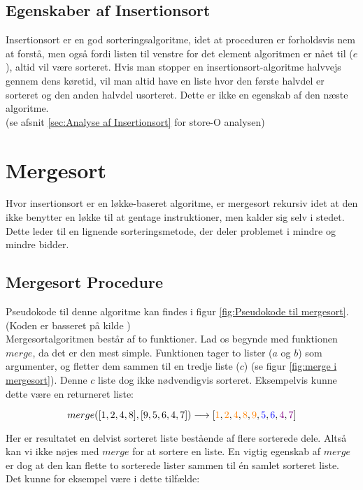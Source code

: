 \subsection{Egenskaber af Insertionsort}%
\label{sub:Egenskaber af Insertionsort}
Insertionsort er en god sorteringsalgoritme, idet at proceduren er forholdsvis nem at forstå, men også fordi listen til venstre for det element algoritmen er nået til ($e$), altid vil være sorteret. Hvis man stopper en insertionsort-algoritme halvvejs gennem dens køretid, vil man altid have en liste hvor den første halvdel er sorteret og den anden halvdel usorteret. Dette er ikke en egenskab af den næste algoritme.\\

(se afsnit \ref{sec:Analyse af Insertionsort} for store-O analysen)



\section{Mergesort}
\label{sec:Mergesort}

Hvor insertionsort er en løkke-baseret algoritme, er mergesort rekursiv idet at den ikke benytter en løkke til at gentage instruktioner, men kalder sig selv i stedet. Dette leder til en lignende sorteringsmetode, der deler problemet i mindre og mindre bidder. 

\subsection{Mergesort Procedure}%
\label{sub:Mergesort Procedure}

Pseudokode til denne algoritme kan findes i figur \ref{fig:Pseudokode til mergesort}. (Koden er basseret på kilde \cite[s. 106]{aogd})\\

Mergesortalgoritmen består af to funktioner. Lad os begynde med funktionen $merge$, da det er den mest simple. Funktionen tager to lister ($a$ og $b$) som argumenter, og fletter dem sammen til en tredje liste ($c$) (se figur \ref{fig:merge i mergesort}). Denne $c$ liste dog ikke nødvendigvis sorteret. Eksempelvis kunne dette være en returneret liste:

$$merge([1,2,4,8],[9,5,6,4,7]) \longrightarrow [\color{orange}1\color{black}, \color{orange}2\color{black}, \color{orange}4\color{black}, \color{orange}8\color{black}, \color{orange}9\color{black}, \color{blue}5\color{black}, \color{blue}6\color{black}, \color{violet}4\color{black}, \color{violet}7\color{black}]$$

Her er resultatet en delvist sorteret liste bestående af flere sorterede dele. Altså kan vi ikke nøjes med $merge$ for at sortere en liste. En vigtig egenskab af $merge$ er dog at den kan flette to sorterede lister sammen til én samlet sorteret liste. Det kunne for eksempel være i dette tilfælde:

